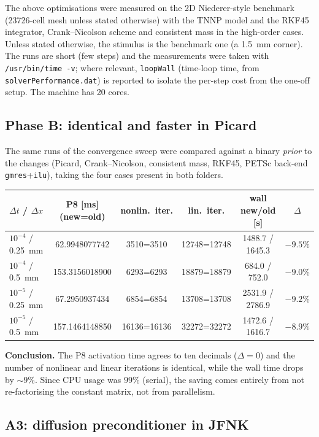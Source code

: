\documentclass[11pt,a4paper]{article}
\newcommand{\code}[1]{\texttt{\small #1}}
\begin{document}
The above optimisations were measured on the 2D Niederer-style benchmark
(\num{23726}-cell mesh unless stated otherwise) with the TNNP model and the RKF45
integrator, Crank--Nicolson scheme and consistent mass in the high-order cases.
Unless stated otherwise, the stimulus is the benchmark one (a
\SI{1.5}{\milli\meter} corner). The runs are short (few steps) and the measurements were
taken with \code{/usr/bin/time -v}; where relevant, \code{loopWall}
(time-loop time, from \code{solverPerformance.dat}) is reported to isolate the per-step
cost from the one-off setup. The machine has 20 cores.

\subsection{Phase B: identical and faster in Picard}
\label{sec:exp-B}

The same runs of the convergence sweep were compared against a binary
\emph{prior} to the changes (Picard, Crank--Nicolson, consistent mass, RKF45,
PETSc back-end \code{gmres}+\code{ilu}), taking the four cases present in
both folders.

\begin{center}
\begin{tabular}{@{}lccccc@{}}
\toprule
$\Delta t$ / $\Delta x$ & P8 [ms] (new=old) & nonlin.\ iter. & lin.\ iter. &
    wall new/old [s] & $\Delta$ \\
\midrule
$10^{-4}$ / \SI{0.25}{mm} & 62.9948077742 & 3510=3510 & 12748=12748 & 1488.7 / 1645.3 & $-9.5\%$ \\
$10^{-4}$ / \SI{0.5}{mm}  & 153.3156018900 & 6293=6293 & 18879=18879 & 684.0 / 752.0 & $-9.0\%$ \\
$10^{-5}$ / \SI{0.25}{mm} & 67.2950937434 & 6854=6854 & 13708=13708 & 2531.9 / 2786.9 & $-9.2\%$ \\
$10^{-5}$ / \SI{0.5}{mm}  & 157.1464148850 & 16136=16136 & 32272=32272 & 1472.6 / 1616.7 & $-8.9\%$ \\
\bottomrule
\end{tabular}
\end{center}

\noindent\textbf{Conclusion.} The P8 activation time agrees to ten
decimals ($\Delta=0$) and the number of nonlinear and linear iterations is
identical, while the wall time drops by $\sim 9\%$. Since CPU usage was
$99\%$ (serial), the saving comes entirely from not re-factorising the constant
matrix, not from parallelism.

\subsection{A3: diffusion preconditioner in JFNK}
\label{sec:exp-A3}
\end{document}
